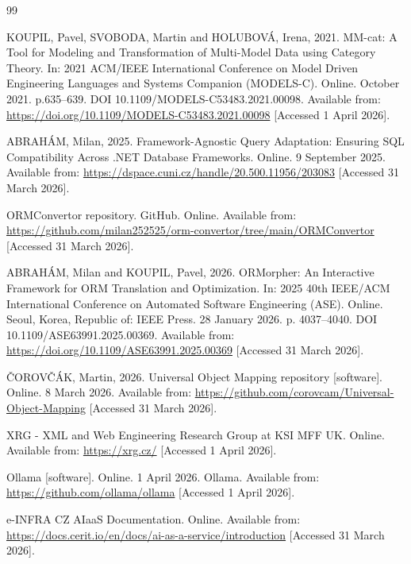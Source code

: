 \documentclass{article}
\begin{document}
\begin{thebibliography}{99}

KOUPIL, Pavel, SVOBODA, Martin and HOLUBOVÁ, Irena, 2021. MM-cat: A Tool for Modeling and Transformation of Multi-Model Data using Category Theory. In: 2021 ACM/IEEE International Conference on Model Driven Engineering Languages and Systems Companion (MODELS-C). Online. October 2021. p.635–639. DOI 10.1109/MODELS-C53483.2021.00098. Available from: \url{https://doi.org/10.1109/MODELS-C53483.2021.00098} [Accessed 1 April 2026]. 

ABRAHÁM, Milan, 2025. Framework-Agnostic Query Adaptation: Ensuring SQL Compatibility Across .NET Database Frameworks. Online. 9 September 2025. Available from: \url{https://dspace.cuni.cz/handle/20.500.11956/203083} [Accessed 31 March 2026].

ORMConvertor repository. GitHub. Online. Available from: \url{https://github.com/milan252525/orm-convertor/tree/main/ORMConvertor} [Accessed 31 March 2026].

ABRAHÁM, Milan and KOUPIL, Pavel, 2026. ORMorpher: An Interactive Framework for ORM Translation and Optimization. In: 2025 40th IEEE/ACM International Conference on Automated Software Engineering (ASE). Online. Seoul, Korea, Republic of: IEEE Press. 28 January 2026. p. 4037–4040. DOI 10.1109/ASE63991.2025.00369. Available from: \url{https://doi.org/10.1109/ASE63991.2025.00369} [Accessed 31 March 2026].

ČOROVČÁK, Martin, 2026. Universal Object Mapping repository [software]. Online. 8 March 2026. Available from: \url{https://github.com/corovcam/Universal-Object-Mapping} [Accessed 31 March 2026].

XRG - XML and Web Engineering Research Group at KSI MFF UK. Online. Available from: \url{https://xrg.cz/} [Accessed 1 April 2026].

Ollama [software]. Online. 1 April 2026. Ollama. Available from: \url{https://github.com/ollama/ollama} [Accessed 1 April 2026].


e-INFRA CZ AIaaS Documentation. Online. Available from: \url{https://docs.cerit.io/en/docs/ai-as-a-service/introduction} [Accessed 31 March 2026]. 

\end{thebibliography}
\end{document}
